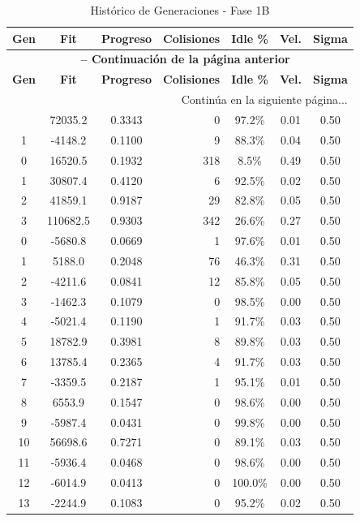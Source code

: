 \documentclass{article}
\begin{document}
\footnotesize
\begin{longtable}{@{}cccrccc@{}}
\caption{Histórico de Generaciones - Fase 1B} \label{tab:fase1b} \\
\toprule
\textbf{Gen} & \textbf{Fit} & \textbf{Progreso} & \textbf{Colisiones} & \textbf{Idle \%} & \textbf{Vel.} & \textbf{Sigma} \\
\endfirsthead
\multicolumn{7}{c}{{\bfseries \tablename\ \thetable{} -- Continuación de la página anterior}} \\
\toprule
\textbf{Gen} & \textbf{Fit} & \textbf{Progreso} & \textbf{Colisiones} & \textbf{Idle \%} & \textbf{Vel.} & \textbf{Sigma} \\
\endhead
\midrule
\multicolumn{7}{r}{{Continúa en la siguiente página...}} \\
\bottomrule
\endfoot
\bottomrule
\endlastfoot
0 & 72035.2 & 0.3343 & 0 & 97.2\% & 0.01 & 0.50 \\
1 & -4148.2 & 0.1100 & 9 & 88.3\% & 0.04 & 0.50 \\
0 & 16520.5 & 0.1932 & 318 & 8.5\% & 0.49 & 0.50 \\
1 & 30807.4 & 0.4120 & 6 & 92.5\% & 0.02 & 0.50 \\
2 & 41859.1 & 0.9187 & 29 & 82.8\% & 0.05 & 0.50 \\
3 & 110682.5 & 0.9303 & 342 & 26.6\% & 0.27 & 0.50 \\
0 & -5680.8 & 0.0669 & 1 & 97.6\% & 0.01 & 0.50 \\
1 & 5188.0 & 0.2048 & 76 & 46.3\% & 0.31 & 0.50 \\
2 & -4211.6 & 0.0841 & 12 & 85.8\% & 0.05 & 0.50 \\
3 & -1462.3 & 0.1079 & 0 & 98.5\% & 0.00 & 0.50 \\
4 & -5021.4 & 0.1190 & 1 & 91.7\% & 0.03 & 0.50 \\
5 & 18782.9 & 0.3981 & 8 & 89.8\% & 0.03 & 0.50 \\
6 & 13785.4 & 0.2365 & 4 & 91.7\% & 0.03 & 0.50 \\
7 & -3359.5 & 0.2187 & 1 & 95.1\% & 0.01 & 0.50 \\
8 & 6553.9 & 0.1547 & 0 & 98.6\% & 0.00 & 0.50 \\
9 & -5987.4 & 0.0431 & 0 & 99.8\% & 0.00 & 0.50 \\
10 & 56698.6 & 0.7271 & 0 & 89.1\% & 0.03 & 0.50 \\
11 & -5936.4 & 0.0468 & 0 & 98.6\% & 0.00 & 0.50 \\
12 & -6014.9 & 0.0413 & 0 & 100.0\% & 0.00 & 0.50 \\
13 & -2244.9 & 0.1083 & 0 & 95.2\% & 0.02 & 0.50 \\

\end{longtable}
\end{document}
